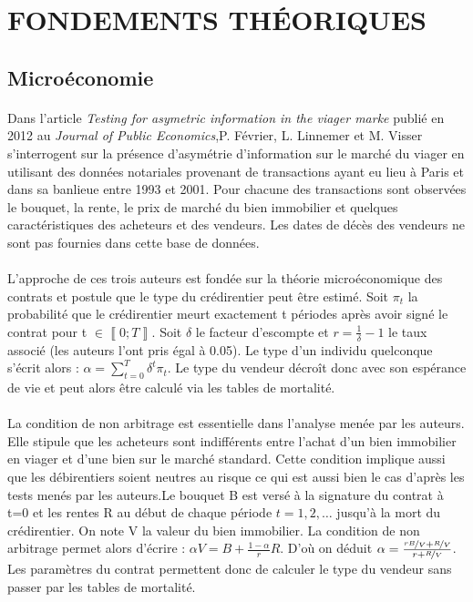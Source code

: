 \documentclass[12pt,a4paper]{article}
\begin{document}
\newpage

\section{FONDEMENTS THÉORIQUES}
\subsection{Microéconomie}
\paragraph{}
Dans l’article \textit{Testing for asymetric information in the viager marke} publié en 2012 au \textit{Journal of Public Economics},P.  Février,  L. Linnemer et M. Visser s’interrogent sur la présence d’asymétrie d’information sur le marché du viager en utilisant des données notariales provenant de transactions ayant eu lieu à Paris et dans sa banlieue entre 1993 et 2001. Pour chacune des transactions sont observées le bouquet, la rente, le prix de marché du bien immobilier et quelques caractéristiques des acheteurs et des vendeurs. Les dates de décès des vendeurs ne sont pas fournies dans cette base de données.

\paragraph{}

L’approche de ces trois auteurs est fondée sur la théorie microéconomique des contrats et postule que le type du crédirentier peut être estimé. Soit $\pi_{t}$ la probabilité que le crédirentier meurt exactement t périodes après avoir signé le contrat pour t $\in\left\llbracket 0;T\right\rrbracket$. Soit $\delta$ le facteur d’escompte et $r=\frac{1}{\delta}-1$ le taux associé (les auteurs l’ont pris égal à 0.05). Le type d’un individu quelconque s’écrit alors : $\alpha=\sum_{t=0}^{T}\delta^{t}\pi_{t}$. Le type du vendeur décroît donc avec son espérance de vie et peut alors être calculé via les tables de mortalité.

\paragraph{}

La condition de non arbitrage est essentielle dans l’analyse menée par les auteurs. Elle stipule que les acheteurs sont indifférents entre l’achat d’un bien immobilier en viager et d’une bien sur le marché standard. Cette condition implique aussi que les débirentiers soient neutres au risque ce qui est aussi bien le cas d’après les tests menés par les auteurs.Le bouquet B est versé à la signature du contrat à t=0 et les rentes R au début de chaque période $t=1,2,\ldots$ jusqu’à la mort du crédirentier. On note V la valeur du bien immobilier. La condition de non arbitrage permet alors d’écrire : $\alpha V=B+\frac{1-\alpha}{r}R$. D’où on déduit $\alpha=\frac{\nicefrac{rB}{V}+\nicefrac{R}{V}}{r+\nicefrac{R}{V}}$. Les paramètres du contrat permettent donc de calculer le type du vendeur sans passer par les tables de mortalité. 
\end{document}
